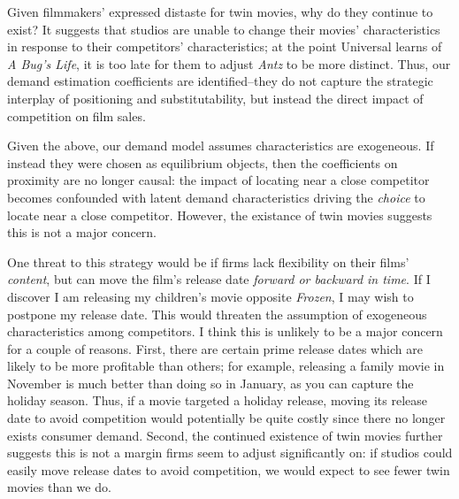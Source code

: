 \documentclass{article}
\begin{document}
Given filmmakers' expressed distaste for twin movies, why do they continue to exist? It suggests that studios are unable to change their movies' characteristics in response to their competitors' characteristics; at the point Universal learns of \emph{A Bug's Life}, it is too late for them to adjust \emph{Antz} to be more distinct. Thus, our demand estimation coefficients are identified--they do not capture the strategic interplay of positioning and substitutability, but instead the direct impact of competition on film sales.

Given the above, our demand model assumes characteristics are exogeneous. If instead they were chosen as equilibrium objects, then the coefficients on proximity are no longer causal: the impact of locating near a close competitor becomes confounded with latent demand characteristics driving the \emph{choice} to locate near a close competitor. However, the existance of twin movies suggests this is not a major concern.




One threat to this strategy would be if firms lack flexibility on their films' \emph{content}, but can move the film's release date \emph{forward or backward in time}. If I discover I am releasing my children's movie opposite \emph{Frozen}, I may wish to postpone my release date. This would threaten the assumption of exogeneous characteristics among competitors. I think this is unlikely to be a major concern for a couple of reasons. First, there are certain prime release dates which are likely to be more profitable than others; for example, releasing a family movie in November is much better than doing so in January, as you can capture the holiday season. Thus, if a movie targeted a holiday release, moving its release date to avoid competition would potentially be quite costly since there no longer exists consumer demand. Second, the continued existence of twin movies further suggests this is not a margin firms seem to adjust significantly on: if studios could easily move release dates to avoid competition, we would expect to see fewer twin movies than we do. 
\end{document}
